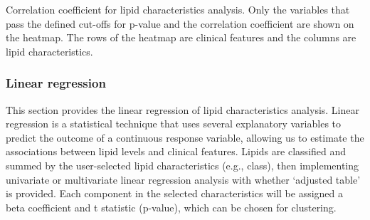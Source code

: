 \documentclass[]{article}
\newcommand{\hlnum}[1]{\textcolor[rgb]{0.816,0.125,0.439}{#1}}%
\newcommand{\hlcom}[1]{\textcolor[rgb]{0.502,0.502,0.502}{\textit{#1}}}%
\newcommand{\hlopt}[1]{\textcolor[rgb]{0,0,0}{#1}}%
\newcommand{\hlstd}[1]{\textcolor[rgb]{0.251,0.251,0.251}{#1}}%
\newcommand{\hlkwd}[1]{\textcolor[rgb]{0.878,0.439,0.125}{#1}}%
\newenvironment{Shaded}{\begin{myshaded}}{\end{myshaded}}
\newcommand{\KeywordTok}[1]{\hlkwd{#1}}
\newcommand{\DecValTok}[1]{\hlnum{#1}}
\newcommand{\CommentTok}[1]{\hlcom{#1}}
\newcommand{\OperatorTok}[1]{\hlopt{#1}}
\newcommand{\NormalTok}[1]{\hlstd{#1}}
\begin{document}
\begin{Shaded}
\end{Shaded}

\begin{Shaded}
\end{Shaded}

\label{fig:unnamed-chunk-72}Correlation coefficient for lipid characteristics analysis. Only the variables that pass the defined cut-offs for p-value and the correlation coefficient are shown on the heatmap. The rows of the heatmap are clinical features and the columns are lipid characteristics.

\hypertarget{linear-regression}{%
\subsubsection{Linear regression}\label{linear-regression}}

This section provides the linear regression of lipid characteristics analysis. Linear regression is a statistical technique that uses several explanatory variables to predict the outcome of a continuous response variable, allowing us to estimate the associations between lipid levels and clinical features. Lipids are classified and summed by the user-selected lipid characteristics (e.g., class), then implementing univariate or multivariate linear regression analysis with whether `adjusted table' is provided. Each component in the selected characteristics will be assigned a beta coefficient and t statistic (p-value), which can be chosen for clustering.
\end{document}
